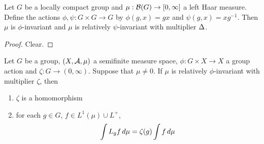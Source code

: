 \documentclass{book}
\begin{document}
	\begin{ex}
		Let $G$ be a locally compact group and $\mu: \mathcal{B}(G) \rightarrow [0,\infty]$ a left Haar measure. Define the actions $\phi, \psi : G \times G \rightarrow G$ by $\phi(g, x) = gx$ and $\psi(g, x) = xg^{-1}$. Then $\mu$ is $\phi$-invariant and $\mu$ is relatively $\psi$-invariant with multiplier $\Delta$. 
	\end{ex}
	
	\begin{proof}
		Clear.
	\end{proof}

	\begin{ex}
		Let $G$ be a group, $(X, \mathcal{A}, \mu)$ a semifinite measure space, $\phi: G \times X \rightarrow X$ a group action and $\zeta: G \rightarrow (0, \infty)$. Suppose that $\mu \neq 0$. If $\mu$ is relatively $\phi$-invariant with multiplier $\zeta$, then 
		\begin{enumerate}
			\item $\zeta$ is a homomorphism
			\item for each $g \in G$, $f \in L^1(\mu) \cup L^+$, $$\int L_g f \, d \mu = \zeta(g) \int f \, d \mu$$ 
		\end{enumerate} 
	\end{ex}
\end{document}
